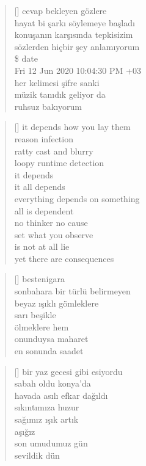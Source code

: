 \documentclass[a5paper, openright, twoside]{memoir}
\let\oldnormalfont\normalfont{}
\def\normalfont{\oldnormalfont\mdseries}
\begin{document}
\begin{verse}[\versewidth]
  cevap bekleyen gözlere \\
  hayat bi şarkı söylemeye başladı \\
  konuşanın karşısında tepkisizim \\
  sözlerden hiçbir şey anlamıyorum \\
  \ttfamily
  \$ date \\
  Fri 12 Jun 2020 10:04:30 PM +03 \\
  \normalfont{}
  her kelimesi şifre sanki \\
  müzik tanıdık geliyor da \\
  ruhsuz bakıyorum \\
\end{verse}
\begin{verse}[\versewidth]
  it depends how you lay them \\
  reason infection \\
  ratty cast and blurry \\
  loopy runtime detection \\
  it depends \\
  it all depends \\
  everything depends on something \\
  all is dependent \\
  no thinker no cause \\
  set what you observe \\
  is not at all lie \\
  yet there are consequences \\
\end{verse}
\begin{verse}[\versewidth]
  bestenigara \\
  sonbahara bir türlü belirmeyen \\
  beyaz ışıklı gömleklere \\
  sarı beşikle \\
  ölmeklere hem \\
  onunduysa maharet \\
  en sonunda saadet \\
\end{verse}
\begin{verse}[\versewidth]
  bir yaz gecesi gibi esiyordu \\
  sabah oldu konya'da \\
  havada asılı efkar dağıldı \\
  sıkıntımıza huzur \\
  sağımız ışık artık \\
  aşığız \\
  son umudumuz gün \\
  sevildik dün \\
\end{verse}
\end{document}
